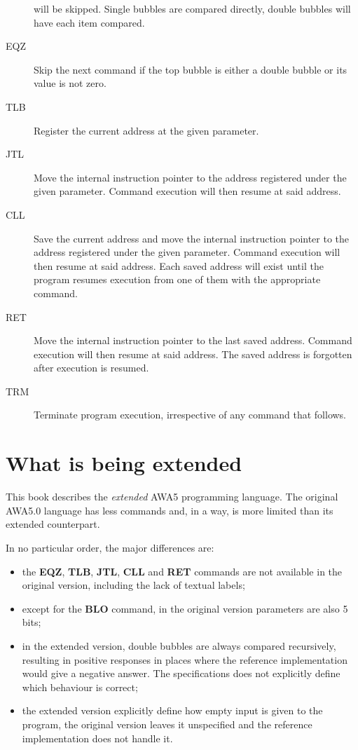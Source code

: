 \documentclass[11pt,a4paper,draft]{book}
\begin{document}
\begin{description}
  will be skipped. Single bubbles are compared directly, double
  bubbles will have each item compared.
\item[EQZ] Skip the next command if the top bubble is either a double
  bubble or its value is not zero.
\item[TLB] Register the current address at the given parameter.
\item[JTL] Move the internal instruction pointer to the address
  registered under the given parameter. Command execution will then
  resume at said address.
\item[CLL] Save the current address and move the internal instruction
  pointer to the address registered under the given parameter. Command
  execution will then resume at said address. Each saved address will
  exist until the program resumes execution from one of them with the
  appropriate command.
\item[RET] Move the internal instruction pointer to the last saved
  address. Command execution will then resume at said address. The
  saved address is forgotten after execution is resumed.
\item[TRM] Terminate program execution, irrespective of any command
  that follows.
\end{description}

\chapter{What is being extended}
This book describes the \emph{extended} AWA5 programming language. The
original AWA5.0 language has less commands and, in a way, is more
limited than its extended counterpart.

In no particular order, the major differences are:
\begin{itemize}
\item the \textbf{EQZ}, \textbf{TLB}, \textbf{JTL}, \textbf{CLL} and
  \textbf{RET} commands are not available in the original version,
  including the lack of textual labels;
\item except for the \textbf{BLO} command, in the original version
  parameters are also \num{5} bits;
\item in the extended version, double bubbles are always compared
  recursively, resulting in positive responses in places where the
  reference implementation would give a negative answer. The
  specifications does not explicitly define which behaviour is
  correct;
\item the extended version explicitly define how empty input is given
  to the program, the original version leaves it unspecified and the
  reference implementation does not handle it.
\end{itemize}
\end{document}
